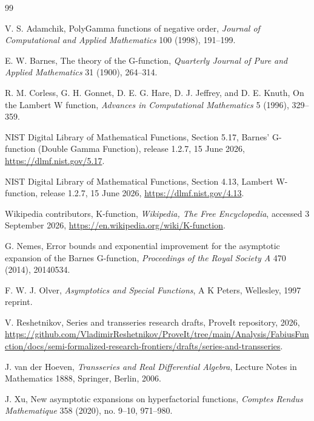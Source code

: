 \documentclass[11pt,a4paper]{article}
\numberwithin{equation}{section}
\theoremstyle{remark}
\begin{document}
\begin{thebibliography}{99}

V. S. Adamchik,
\newblock PolyGamma functions of negative order,
\newblock \emph{Journal of Computational and Applied Mathematics}
100 (1998), 191--199.

E. W. Barnes,
\newblock The theory of the G-function,
\newblock \emph{Quarterly Journal of Pure and Applied Mathematics}
31 (1900), 264--314.

R. M. Corless, G. H. Gonnet, D. E. G. Hare, D. J. Jeffrey, and D. E. Knuth,
\newblock On the Lambert W function,
\newblock \emph{Advances in Computational Mathematics} 5 (1996), 329--359.

NIST Digital Library of Mathematical Functions,
\newblock Section 5.17, Barnes' G-function (Double Gamma Function),
\newblock release 1.2.7, 15 June 2026,
\newblock \url{https://dlmf.nist.gov/5.17}.

NIST Digital Library of Mathematical Functions,
\newblock Section 4.13, Lambert W-function,
\newblock release 1.2.7, 15 June 2026,
\newblock \url{https://dlmf.nist.gov/4.13}.

Wikipedia contributors,
\newblock K-function,
\newblock \emph{Wikipedia, The Free Encyclopedia}, accessed 3 September 2026,
\newblock \url{https://en.wikipedia.org/wiki/K-function}.

G. Nemes,
\newblock Error bounds and exponential improvement for the asymptotic
expansion of the Barnes G-function,
\newblock \emph{Proceedings of the Royal Society A} 470 (2014), 20140534.

F. W. J. Olver,
\newblock \emph{Asymptotics and Special Functions},
\newblock A K Peters, Wellesley, 1997 reprint.

V. Reshetnikov,
\newblock Series and transseries research drafts,
\newblock ProveIt repository, 2026,
\newblock \url{https://github.com/VladimirReshetnikov/ProveIt/tree/main/Analysis/FabiusFunction/docs/semi-formalized-research-frontiers/drafts/series-and-transseries}.

J. van der Hoeven,
\newblock \emph{Transseries and Real Differential Algebra},
\newblock Lecture Notes in Mathematics 1888, Springer, Berlin, 2006.

J. Xu,
\newblock New asymptotic expansions on hyperfactorial functions,
\newblock \emph{Comptes Rendus Mathematique} 358 (2020), no. 9--10,
971--980.

\end{thebibliography}
\end{document}
